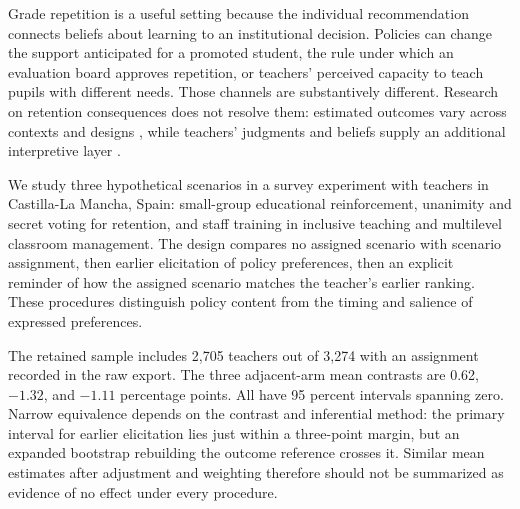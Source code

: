 Grade repetition is a useful setting because the individual recommendation connects beliefs about learning to an institutional decision. Policies can change the support anticipated for a promoted student, the rule under which an evaluation board approves repetition, or teachers' perceived capacity to teach pupils with different needs. Those channels are substantively different. Research on retention consequences does not resolve them: estimated outcomes vary across contexts and designs \cite{allen,goos}, while teachers' judgments and beliefs supply an additional interpretive layer \cite{tomchin,bonvin}.

We study three hypothetical scenarios in a survey experiment with teachers in Castilla-La Mancha, Spain: small-group educational reinforcement, unanimity and secret voting for retention, and staff training in inclusive teaching and multilevel classroom management. The design compares no assigned scenario with scenario assignment, then earlier elicitation of policy preferences, then an explicit reminder of how the assigned scenario matches the teacher's earlier ranking. These procedures distinguish policy content from the timing and salience of expressed preferences.


The retained sample includes 2,705 teachers out of 3,274 with an assignment recorded in the raw export. The three adjacent-arm mean contrasts are 0.62, $-1.32$, and $-1.11$ percentage points. All have 95 percent intervals spanning zero. Narrow equivalence depends on the contrast and inferential method: the primary interval for earlier elicitation lies just within a three-point margin, but an expanded bootstrap rebuilding the outcome reference crosses it. Similar mean estimates after adjustment and weighting therefore should not be summarized as evidence of no effect under every procedure.


